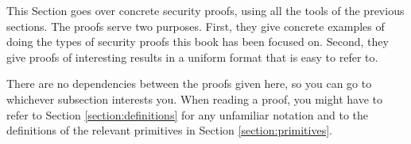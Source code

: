 This Section goes over concrete security proofs, using all the tools of the previous sections. The proofs serve two purposes. First, they give concrete examples of doing the types of security proofs this book has been focused on. Second, they give proofs of interesting results in a uniform format that is easy to refer to.

There are no dependencies between the proofs given here, so you can go to whichever subsection interests you. When reading a proof, you might have to refer to Section \ref{section:definitions} for any unfamiliar notation and to the definitions of the relevant primitives in Section \ref{section:primitives}.